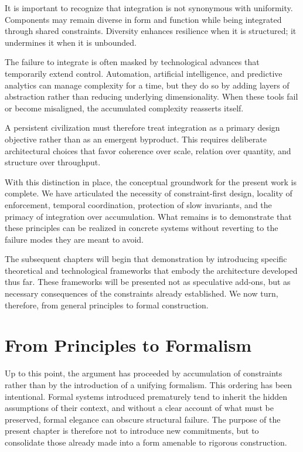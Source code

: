 \documentclass[12pt,oneside]{book}
\begin{document}
It is important to recognize that integration is not synonymous with uniformity. Components may remain diverse in form and function while being integrated through shared constraints. Diversity enhances resilience when it is structured; it undermines it when it is unbounded.

The failure to integrate is often masked by technological advances that temporarily extend control. Automation, artificial intelligence, and predictive analytics can manage complexity for a time, but they do so by adding layers of abstraction rather than reducing underlying dimensionality. When these tools fail or become misaligned, the accumulated complexity reasserts itself.

A persistent civilization must therefore treat integration as a primary design objective rather than as an emergent byproduct. This requires deliberate architectural choices that favor coherence over scale, relation over quantity, and structure over throughput.

With this distinction in place, the conceptual groundwork for the present work is complete. We have articulated the necessity of constraint-first design, locality of enforcement, temporal coordination, protection of slow invariants, and the primacy of integration over accumulation. What remains is to demonstrate that these principles can be realized in concrete systems without reverting to the failure modes they are meant to avoid.

The subsequent chapters will begin that demonstration by introducing specific theoretical and technological frameworks that embody the architecture developed thus far. These frameworks will be presented not as speculative add-ons, but as necessary consequences of the constraints already established. We now turn, therefore, from general principles to formal construction.

\chapter{From Principles to Formalism}

Up to this point, the argument has proceeded by accumulation of constraints rather than by the introduction of a unifying formalism. This ordering has been intentional. Formal systems introduced prematurely tend to inherit the hidden assumptions of their context, and without a clear account of what must be preserved, formal elegance can obscure structural failure. The purpose of the present chapter is therefore not to introduce new commitments, but to consolidate those already made into a form amenable to rigorous construction.
\end{document}
